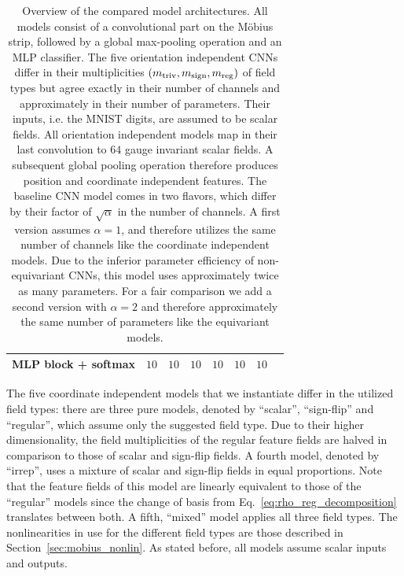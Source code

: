 \begin{table}
\begin{tabular}{lccccccc}
        MLP block + softmax \hspace*{-3ex}
                           & $10$          & $10$          & $10$          & $10$            & $10$           & $10$           \\
        \bottomrule
    \end{tabular}
    \vspace*{2.ex}
    \caption[]{\small
        Overview of the compared model architectures.
        All models consist of a convolutional part on the M\"obius strip, followed by a global max-pooling operation and an MLP classifier.
        The five orientation independent CNNs differ in their multiplicities $(m_{\textup{triv}},m_{\textup{sign}},m_{\textup{reg}})$ of field types but agree exactly in their number of channels and approximately in their number of parameters.
        Their inputs, i.e. the MNIST digits, are assumed to be scalar fields.
        All orientation independent models map in their last convolution to $64$ gauge invariant scalar fields.
        A subsequent global pooling operation therefore produces position and coordinate independent features.
        The baseline CNN model comes in two flavors, which differ by their factor of $\sqrt{\alpha}$ in the number of channels.
        A first version assumes $\alpha=1$, and therefore utilizes the same number of channels like the coordinate independent models.
        Due to the inferior parameter efficiency of non-equivariant CNNs, this model uses approximately twice as many parameters.
        For a fair comparison we add a second version with $\alpha=2$ and therefore approximately the same number of parameters like the equivariant models.
    }
    \label{tab:mobius_model_architectures}
\end{table}

The five coordinate independent models that we instantiate differ in the utilized field types:
there are three pure models, denoted by ``scalar'', ``sign-flip'' and ``regular'', which assume only the suggested field type.
Due to their higher dimensionality, the field multiplicities of the regular feature fields are halved in comparison to those of scalar and sign-flip fields.
A fourth model, denoted by ``irrep'', uses a mixture of scalar and sign-flip fields in equal proportions.
Note that the feature fields of this model are linearly equivalent to those of the ``regular'' models since the change of basis from Eq.~\eqref{eq:rho_reg_decomposition} translates between both.
A fifth, ``mixed'' model applies all three field types.
The nonlinearities in use for the different field types are those described in Section~\ref{sec:mobius_nonlin}.
As stated before, all models assume scalar inputs and outputs.

